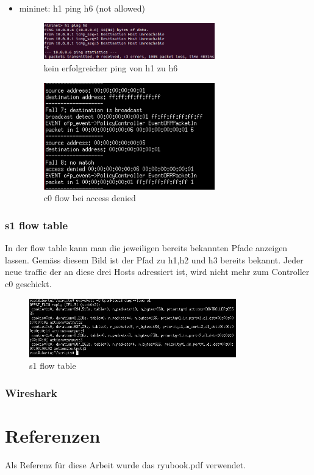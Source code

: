 \documentclass[a4,12pt]{scrartcl}
\begin{document}
\begin{itemize}
\item mininet: h1 ping h6 (not allowed)
\begin{figure} [H]
	\begin{center}
	\includegraphics[width=0.70\textwidth]{./pictures/h1_ping_h6_nok.png}
	\caption{kein erfolgreicher ping von h1 zu h6}
	\label{x}
	\end{center}
\end{figure} 
\begin{figure} [H]
	\begin{center}
	\includegraphics[width=0.70\textwidth]{./pictures/h1_ping_h6.png}
	\caption{c0 flow bei access denied}
	\label{x}
	\end{center}
\end{figure} 
\end{itemize}

\subsubsection{s1 flow table}
In der flow table kann man die jeweiligen bereits bekannten Pfade anzeigen lassen. Gemäss diesem Bild ist der Pfad zu h1,h2 und h3 bereits bekannt. Jeder neue traffic der an diese drei Hosts adressiert ist, wird nicht mehr zum Controller c0 geschickt. 
\begin{figure} [H]
	\begin{center}
	\includegraphics[width=0.80\textwidth]{./pictures/ex4_flow_table.png}
	\caption{s1 flow table}
	\label{x}
	\end{center}
\end{figure} 

\subsubsection{Wireshark}


\section{Referenzen}
Als Referenz für diese Arbeit wurde das ryubook.pdf verwendet. 
\end{document}

